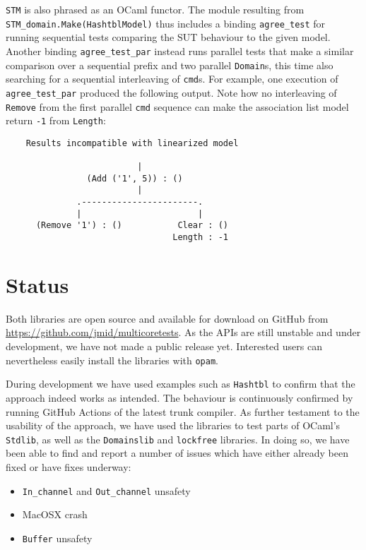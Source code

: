 \documentclass[twocolumn,10pt]{article}
\begin{document}
\texttt{STM} is also phrased as an OCaml functor. The module resulting from
\texttt{STM\_domain.Make(HashtblModel)} thus includes a binding
\lstinline|agree_test| for running sequential tests comparing the SUT
behaviour to the given model.
Another binding
\lstinline|agree_test_par| instead runs parallel tests that make a similar
  comparison over a sequential prefix and two parallel \texttt{Domain}s, this
  time also searching for a sequential interleaving of \texttt{cmd}s.
For example, one execution of \lstinline|agree_test_par| produced the following
output. Note how no interleaving of \texttt{Remove} from the first parallel
\texttt{cmd} sequence can make the association list model return \lstinline|-1| from
\texttt{Length}:

\begingroup{}
\begin{lstlisting}
    Results incompatible with linearized model
    
                          |
                (Add ('1', 5)) : ()
                          |
              .-----------------------.
              |                       |
      (Remove '1') : ()           Clear : ()
                                 Length : -1
\end{lstlisting}
\endgroup
\vspace{-1.6em}

\section{Status}

Both libraries are open source and available for download on GitHub
from \url{https://github.com/jmid/multicoretests}.
As the APIs are still unstable and under development, we have not made
a public release yet. Interested users can nevertheless easily install
the libraries with \texttt{opam}.

During development we have used examples such as \texttt{Hashtbl} to
confirm that the approach indeed works as intended. The behaviour is
continuously confirmed by running GitHub Actions of the latest trunk
compiler. As further testament to the usability of the approach, we
have used the libraries to test parts of OCaml's \texttt{Stdlib}, as well as
the \texttt{Domainslib} and \texttt{lockfree} libraries. In doing so, we have been
able to find and report a number of issues which have either already
been fixed or have fixes underway:
\begin{itemize}
  \tightlist
  \item \lstinline|In_channel| and \lstinline|Out_channel|
    unsafety~\cite{AddFailingOut2022,AuditStdlibMutable2022}
  \item MacOSX crash~\cite{SegfaultMacOSXTrunk2022}
  \item \texttt{Buffer} unsafety~\cite{STMCleanup2022,ParallelAccessBuffer2022}
\end{itemize}
\end{document}

